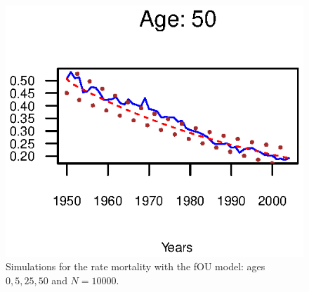 \documentclass[smallextended]{svjour3}
\begin{document}
\begin{figure}[H]
    \includegraphics{PlotWomen50.eps}
    \caption{Simulations for the rate mortality with the fOU model: ages
    $0,5,25,50$ and $N=10000$.}
    \label{graph-simu_FOU1}
\end{figure}
\end{document}
